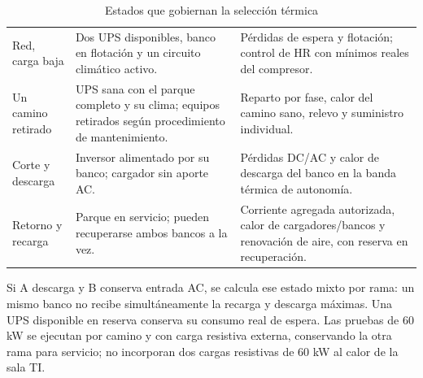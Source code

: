 \begin{table}[htbp]
\centering\small
\caption{Estados que gobiernan la selección térmica}\label{tab:4-estados-termicos}
\begin{tabularx}{\linewidth}{L{25mm}X X}
\hline
{} &  &  \\ \hline
Red, carga baja & Dos UPS disponibles, banco en flotación y un circuito climático activo. & Pérdidas de espera y flotación; control de HR con mínimos reales del compresor. \\ \hline
Un camino retirado & UPS sana con el parque completo y su clima; equipos retirados según procedimiento de mantenimiento. & Reparto por fase, calor del camino sano, relevo y suministro individual. \\ \hline
Corte y descarga & Inversor alimentado por su banco; cargador sin aporte AC. & Pérdidas DC/AC y calor de descarga del banco en la banda térmica de autonomía. \\ \hline
Retorno y recarga & Parque en servicio; pueden recuperarse ambos bancos a la vez. & Corriente agregada autorizada, calor de cargadores/bancos y renovación de aire, con reserva en recuperación. \\ \hline
\end{tabularx}
\end{table}

Si A descarga y B conserva entrada AC, se calcula ese estado mixto por rama: un mismo banco no recibe simultáneamente la recarga y descarga máximas. Una UPS disponible en reserva conserva su consumo real de espera. Las pruebas de 60 kW se ejecutan por camino y con carga resistiva externa, conservando la otra rama para servicio; no incorporan dos cargas resistivas de 60 kW al calor de la sala TI.

